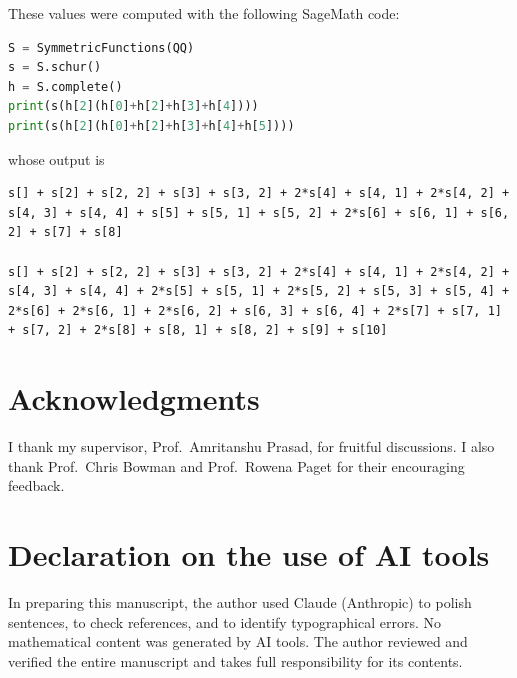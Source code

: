 \documentclass[reqno]{amsart}
\theoremstyle{plain}
\theoremstyle{definition}
\theoremstyle{remark}
\theoremstyle{plain}
\begin{document}
These values were computed with the following SageMath code:
\begin{lstlisting}[language=Python]
S = SymmetricFunctions(QQ)
s = S.schur()
h = S.complete()
print(s(h[2](h[0]+h[2]+h[3]+h[4])))
print(s(h[2](h[0]+h[2]+h[3]+h[4]+h[5])))
\end{lstlisting}
whose output is
\begin{lstlisting}[numbers=none]
s[] + s[2] + s[2, 2] + s[3] + s[3, 2] + 2*s[4] + s[4, 1] + 2*s[4, 2] + s[4, 3] + s[4, 4] + s[5] + s[5, 1] + s[5, 2] + 2*s[6] + s[6, 1] + s[6, 2] + s[7] + s[8]

s[] + s[2] + s[2, 2] + s[3] + s[3, 2] + 2*s[4] + s[4, 1] + 2*s[4, 2] + s[4, 3] + s[4, 4] + 2*s[5] + s[5, 1] + 2*s[5, 2] + s[5, 3] + s[5, 4] + 2*s[6] + 2*s[6, 1] + 2*s[6, 2] + s[6, 3] + s[6, 4] + 2*s[7] + s[7, 1] + s[7, 2] + 2*s[8] + s[8, 1] + s[8, 2] + s[9] + s[10]
\end{lstlisting}

\section*{Acknowledgments}
I thank my supervisor, Prof.~Amritanshu Prasad, for fruitful discussions. I
also thank Prof.~Chris Bowman and Prof.~Rowena Paget for their encouraging
feedback.
\section*{Declaration on the use of AI tools}
In preparing this manuscript, the author used Claude (Anthropic) to polish sentences, to check references, and to identify typographical errors. No mathematical content was generated by AI tools. The author reviewed and verified the entire manuscript and takes full responsibility for its contents.
\end{document}
